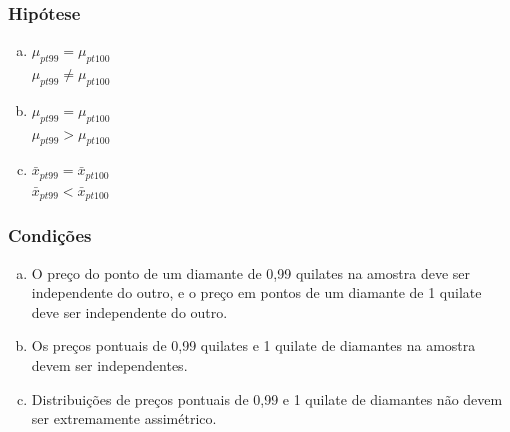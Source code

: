 
\begin{frame}
\frametitle{Hipótese}
\justifying
{}

\begin{enumerate}[(a)]

\item  {} $\mu_{pt99} = \mu_{pt100}$ \\
 $\mu_{pt99} \ne \mu_{pt100}$

\item  {} $\mu_{pt99} = \mu_{pt100}$ \\
 $\mu_{pt99} > \mu_{pt100}$


\item  {} $\bar{x}_{pt99} = \bar{x}_{pt100}$ \\
 $\bar{x}_{pt99} < \bar{x}_{pt100}$

\end{enumerate}

\end{frame}


\begin{frame}
\frametitle{Condições}
\justifying
{}

\begin{enumerate}[(a)]
\justifying
\item O preço do ponto de um diamante de 0,99 quilates na amostra deve ser independente do outro, e o preço em pontos de um diamante de 1 quilate deve ser independente do outro.
\justifying
\item Os preços pontuais de 0,99 quilates e 1 quilate de diamantes na amostra devem ser independentes.
\justifying
\item Distribuições de preços pontuais de 0,99 e 1 quilate de diamantes não devem ser extremamente assimétrico.
\justifying
{}

\end{enumerate}

\end{frame}

